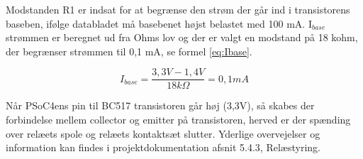 Modstanden R1 er indsat for at begrænse den strøm der går ind i transistorens baseben, ifølge databladet må basebenet højst belastet med 100 mA. I$_{base}$ strømmen er beregnet ud fra Ohms lov og der er valgt en modstand på 18 kohm, der begrænser strømmen til 0,1 mA, se formel \ref{eq:Ibase}.

\begin{equation} 
I_{base} = \frac{3,3V - 1,4V}{18k\Omega} = 0,1mA
\label{eq:Ibase}
\end{equation} 

Når PSoC4ens pin til BC517 transistoren går høj (3,3V), så skabes der forbindelse mellem collector og emitter på transistoren, herved er der spænding over relæets spole og relæets kontaktsæt slutter. Yderlige overvejelser og information kan findes i projektdokumentation afsnit 5.4.3, Relæstyring.




